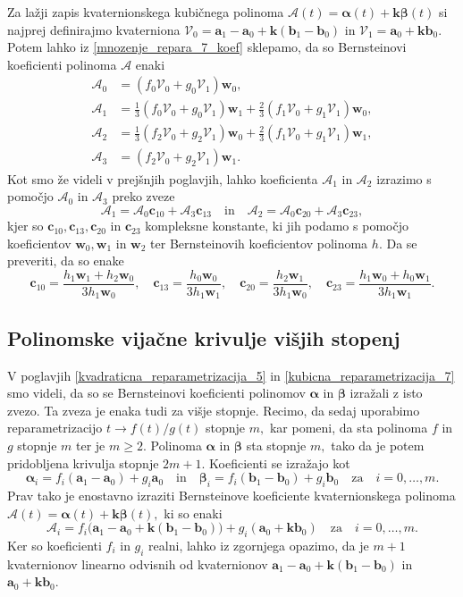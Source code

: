 \documentclass[12pt,a4paper,twoside]{article}
\theoremstyle{definition} %
\theoremstyle{plain} %
\theoremstyle{primerstyle}
\numberwithin{equation}{section}  %
\newcommand{\aV}{\mathbf{a}}
\newcommand{\bV}{\mathbf{b}}
\newcommand{\cV}{\mathbf{c}}
\newcommand{\kV}{\mathbf{k}}
\newcommand{\wV}{\mathbf{w}}
\newcommand{\AQ}{\mathcal{A}}
\newcommand{\VQ}{\mathcal{V}}
\newcommand{\balpha}{\boldsymbol \alpha}
\newcommand{\bbeta}{\boldsymbol \beta}
\begin{document}
Za lažji zapis kvaternionskega kubičnega polinoma $\AQ(t)=\balpha(t)+\kV\bbeta(t)$ si najprej definirajmo kvaterniona $\VQ_0=\aV_1-\aV_0+\kV(\bV_1-\bV_0)$ in $\VQ_1=\aV_0+\kV\bV_0.$ Potem lahko iz \eqref{mnozenje_repara_7_koef} sklepamo, da so Bernsteinovi koeficienti polinoma $\AQ$ enaki
\begin{align*}
	\AQ_0&=(f_0\VQ_0+g_0\VQ_1)\wV_0,\\
	\AQ_1&=\frac{1}{3}(f_0\VQ_0+g_0\VQ_1)\wV_1+\frac{2}{3}(f_1\VQ_0+g_1\VQ_1)\wV_0,\\
	\AQ_2&=\frac{1}{3}(f_2\VQ_0+g_2\VQ_1)\wV_0+\frac{2}{3}(f_1\VQ_0+g_1\VQ_1)\wV_1,\\
	\AQ_3&=(f_2\VQ_0+g_2\VQ_1)\wV_1.
\end{align*}
Kot smo že videli v prejšnjih poglavjih, lahko koeficienta $\AQ_1$ in $\AQ_2$ izrazimo s pomočjo $\AQ_0$ in $\AQ_3$ preko zveze
\begin{equation*}
	\AQ_1=\AQ_0\cV_{10}+\AQ_3\cV_{13}\quad\text{in}\quad\AQ_2=\AQ_0\cV_{20}+\AQ_3\cV_{23},
\end{equation*}
kjer so $\cV_{10},\cV_{13},\cV_{20}$ in $\cV_{23}$ kompleksne konstante, ki jih podamo s pomočjo koeficientov $\wV_0,\wV_1$ in $\wV_2$ ter Bernsteinovih koeficientov polinoma $h.$ Da se preveriti, da so enake
\begin{equation}
	\cV_{10}=\frac{h_1\wV_1+h_2\wV_0}{3h_1\wV_0},\quad\cV_{13}=\frac{h_0\wV_0}{3h_1\wV_1},\quad\cV_{20}=\frac{h_2\wV_1}{3h_1\wV_0},\quad\cV_{23}=\frac{h_1\wV_0+h_0\wV_1}{3h_1\wV_1}.
\end{equation}

\subsection{Polinomske vijačne krivulje višjih stopenj}

V poglavjih \ref{kvadraticna_reparametrizacija_5} in \ref{kubicna_reparametrizacija_7} smo videli, da so se Bernsteinovi koeficienti polinomov $\balpha$ in $\bbeta$ izražali z isto zvezo. Ta zveza je enaka tudi za višje stopnje. Recimo, da sedaj uporabimo reparametrizacijo $t\to f(t)/g(t)$ stopnje $m,$ kar pomeni, da sta polinoma $f$ in $g$ stopnje $m$ ter je $m\geq 2.$ Polinoma $\balpha$ in $\bbeta$ sta stopnje $m,$ tako da je potem pridobljena krivulja stopnje $2m+1.$ Koeficienti se izražajo kot
\begin{equation*}
	\balpha_i=f_i(\aV_1-\aV_0)+g_i\aV_0\quad\text{in}\quad\bbeta_i=f_i(\bV_1-\bV_0)+g_i\bV_0\quad\text{za}\quad i=0,\dots,m.
\end{equation*}
Prav tako je enostavno izraziti Bernsteinove koeficiente kvaternionskega polinoma $\AQ(t)=\balpha(t)+\kV\bbeta(t),$ ki so enaki
\begin{equation*}
	\AQ_i=f_i\big(\aV_1-\aV_0+\kV(\bV_1-\bV_0)\big)+g_i(\aV_0+\kV\bV_0)\quad\text{za}\quad i=0,\dots,m.
\end{equation*}
Ker so koeficienti $f_i$ in $g_i$ realni, lahko iz zgornjega opazimo, da je $m+1$ kvaternionov linearno odvisnih od kvaternionov $\aV_1-\aV_0+\kV(\bV_1-\bV_0)$ in $\aV_0+\kV\bV_0.$
\end{document}

